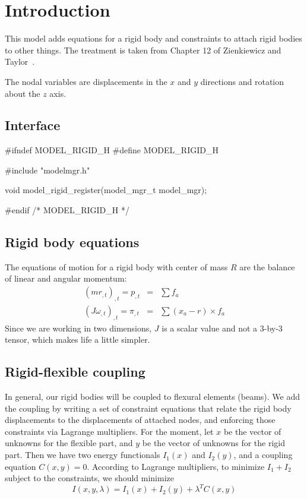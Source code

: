 
\section{Introduction}

This model adds equations for a rigid body and constraints
to attach rigid bodies to other things.  The treatment is taken
from Chapter 12 of Zienkiewicz and Taylor~\cite{ZienTayl00b}.

The nodal variables are displacements in the $x$ and $y$ directions
and rotation about the $z$ axis.


\subsection{Interface}

\endmoddef
#ifndef MODEL_RIGID_H
#define MODEL_RIGID_H

#include "modelmgr.h"

void model_rigid_register(model_mgr_t model_mgr);

#endif /* MODEL_RIGID_H */
\nwendcode{}\nwdocspar


\subsection{Rigid body equations}


The equations of motion for a rigid body with center of mass $R$
are the balance of linear and angular momentum:
\begin{eqnarray*}
  (m      r_{,t})_{,t} =   p_{,t} & = & \sum f_a \\
  (J \omega_{,t})_{,t} = \pi_{,t} & = & \sum (x_a - r) \times f_a
\end{eqnarray*}
Since we are working in two dimensions, $J$ is a scalar value
and not a 3-by-3 tensor, which makes life a little simpler.


\subsection{Rigid-flexible coupling}


In general, our rigid bodies will be coupled to flexural elements
(beams).  We add the coupling by writing a set of constraint
equations that relate the rigid body displacements to the
displacements of attached nodes, and enforcing those constraints
via Lagrange multipliers.  For the moment, let $x$ be the vector
of unknowns for the flexible part, and $y$ be the vector of
unknowns for the rigid part.  Then we have two energy functionals
$I_1(x)$ and $I_2(y)$, and a coupling equation $C(x,y) = 0$.
According to Lagrange multipliers, to minimize $I_1 + I_2$
subject to the constraints, we should minimize
\[
  I(x, y, \lambda) = I_1(x) + I_2(y) + \lambda^T C(x,y)
\]

